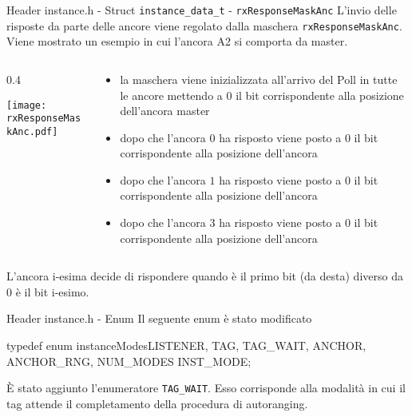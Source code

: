 \begin{frame}[shrink=10]{Header instance.h - Struct \lstinline[language=C]!instance_data_t! - \lstinline[language=C]!rxResponseMaskAnc!}
  L'invio delle risposte da parte delle ancore viene regolato dalla maschera \lstinline[language=C]!rxResponseMaskAnc!.
  Viene mostrato un esempio in cui l'ancora A2 si comporta da master.
  \begin{columns}
    \begin{column}{0.4\textwidth}
      \begin{center}
        \texttt{[image: rxResponseMaskAnc.pdf]}
      \end{center}
    \end{column}
    \begin{column}{0.7\textwidth}
      \begin{itemize}
      \item[1.] la maschera viene inizializzata all'arrivo del Poll in tutte le ancore mettendo a $0$ il bit corrispondente alla posizione dell'ancora master
      \item[2.] dopo che l'ancora $0$ ha risposto viene posto a $0$ il bit corrispondente alla posizione dell'ancora 
      \item[3.] dopo che l'ancora $1$ ha risposto viene posto a $0$ il bit corrispondente alla posizione dell'ancora 
      \item[4.] dopo che l'ancora $3$ ha risposto viene posto a $0$ il bit corrispondente alla posizione dell'ancora 
      \end{itemize}
    \end{column}
  \end{columns}
  \begin{exampleblock}{L'ancora i-esima decide di rispondere}
    quando è il primo bit (da desta) diverso da $0$ è il bit i-esimo.
  \end{exampleblock}
\end{frame}

\begin{frame}[fragile]{Header instance.h - Enum}
  Il seguente enum è stato modificato
  \begin{C}
    typedef enum instanceModes{LISTENER, TAG, TAG_WAIT, ANCHOR, ANCHOR_RNG, NUM_MODES} INST_MODE;
  \end{C}
  È stato aggiunto l'enumeratore \lstinline[language=C]!TAG_WAIT!. Esso corrisponde alla modalità in cui il tag
  attende il completamento della procedura di autoranging.
\end{frame}

